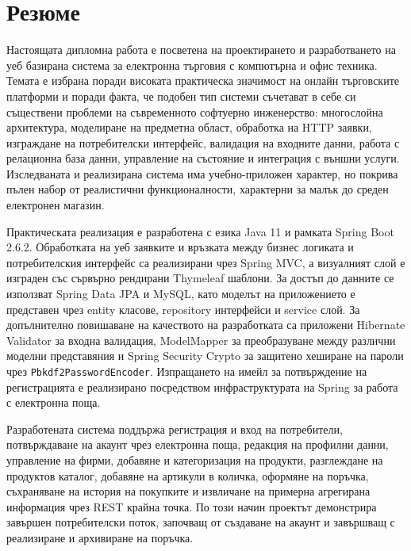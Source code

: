 \section{Резюме}

Настоящата дипломна работа е посветена на проектирането и разработването на уеб базирана система за електронна търговия с компютърна и офис техника. Темата е избрана поради високата практическа значимост на онлайн търговските платформи и поради факта, че подобен тип системи съчетават в себе си съществени проблеми на съвременното софтуерно инженерство: многослойна архитектура, моделиране на предметна област, обработка на HTTP заявки, изграждане на потребителски интерфейс, валидация на входните данни, работа с релационна база данни, управление на състояние и интеграция с външни услуги. Изследваната и реализирана система има учебно-приложен характер, но покрива пълен набор от реалистични функционалности, характерни за малък до среден електронен магазин.

Практическата реализация е разработена с езика Java 11 и рамката Spring Boot 2.6.2. Обработката на уеб заявките и връзката между бизнес логиката и потребителския интерфейс са реализирани чрез Spring MVC, а визуалният слой е изграден със сървърно рендирани Thymeleaf шаблони. За достъп до данните се използват Spring Data JPA и MySQL, като моделът на приложението е представен чрез entity класове, repository интерфейси и service слой. За допълнително повишаване на качеството на разработката са приложени Hibernate Validator за входна валидация, ModelMapper за преобразуване между различни моделни представяния и Spring Security Crypto за защитено хеширане на пароли чрез \texttt{Pbkdf2PasswordEncoder}. Изпращането на имейл за потвърждение на регистрацията е реализирано посредством инфраструктурата на Spring за работа с електронна поща.

Разработената система поддържа регистрация и вход на потребители, потвърждаване на акаунт чрез електронна поща, редакция на профилни данни, управление на фирми, добавяне и категоризация на продукти, разглеждане на продуктов каталог, добавяне на артикули в количка, оформяне на поръчка, съхраняване на история на покупките и извличане на примерна агрегирана информация чрез REST крайна точка. По този начин проектът демонстрира завършен потребителски поток, започващ от създаване на акаунт и завършващ с реализиране и архивиране на поръчка.


